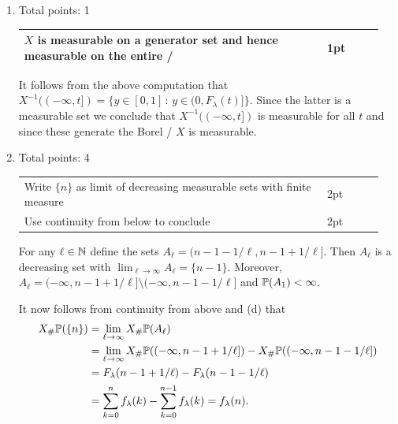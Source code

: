 \documentclass{lecturenotes}
\newcommand{\rubric}[1]{#1}
\begin{document}
\begin{enumerate}[label=(\alph*)]
{}
For the probability space, we again take $\Omega = [0,1]$, $\cF = \cB_{[0,1]}$ and $\bbP = \lambda$ the Lebesgue measure restricted to $[0,1]$. 

Now for any $y \in [0,1]$ let $k := k(y)$ be such that
\[
	\sum_{n = 1}^k f_\lambda(n) \ge y \quad \text{and} \quad \sum_{n = 1}^{k-1} f_\lambda(n) < y,
\]
where the last sum is interpreted as $-1$ if $k=0$.

Now define $X(y) = k(y) : [0,1] \to \bbR$. Then $k(y) \le t$ if and only if $y \le F_\lambda(t)$ and hence
\[
	X^{-1}((-\infty,t]) = \{y \in [0,1] \, : \, k(y) \in (0,t]\}
	= \{y \in [0,1] \, : \, y \in (0, F_\lambda(t)]\},
\]
from which it follows that
\[
	\bbP(X^{-1}((-\infty,t])) = \lambda((0, F_\lambda(t)]) = F_\lambda(t).
\]
\item \rubric{ Total points: 1 \hfill

\begin{tabular}{p{0.8\linewidth}p{0.15\linewidth}}
\hline
$X$ is measurable on a generator set and hence measurable on the entire \sigalg/ & 1pt\\
\hline
\end{tabular}

}
It follows from the above computation that $X^{-1}((-\infty,t]) = \{y \in [0,1] \, : \, y \in (0, F_\lambda(t)]\}$. Since the latter is a measurable set we conclude that $X^{-1}((-\infty,t])$ is measurable for all $t$ and since these generate the Borel \sigalg/ $X$ is measurable.
\item \rubric{ Total points: 4 \hfill

\begin{tabular}{p{0.8\linewidth}p{0.15\linewidth}}
\hline
Write $\{n\}$ as limit of decreasing measurable sets with finite measure & 2pt\\
Use continuity from below to conclude & 2pt\\
\hline
\end{tabular}

}

For any $\ell \in \mathbb N$ define the sets $A_\ell = (n-1-1/\ell, n-1 + 1/\ell]$. Then $A_\ell$ is a decreasing set with $\lim_{\ell \to \infty} A_\ell = \{n-1\}$. Moreover, $A_\ell = (-\infty,n-1+1/\ell] \setminus (-\infty, n-1-1/\ell]$ and $\mathbb P(A_1) < \infty$. 

It now follows from continuity from above and (d) that
\begin{align*}
	X_\#\mathbb P(\{n\}) &= \lim_{\ell \to \infty} X_\# \mathbb P(A_\ell) \\
	&= \lim_{\ell \to \infty} X_\# \mathbb P((-\infty,n-1+1/\ell])
	- X_\# \mathbb P((-\infty,n-1-1/\ell]) \\
	&= F_\lambda(n-1+1/\ell) - F_\lambda(n-1-1/\ell) \\
	&= \sum_{k = 0}^{n} f_\lambda(k) - \sum_{k = 0}^{n-1} f_\lambda(k) = f_\lambda(n).
\end{align*}
\end{enumerate}
\end{document}
